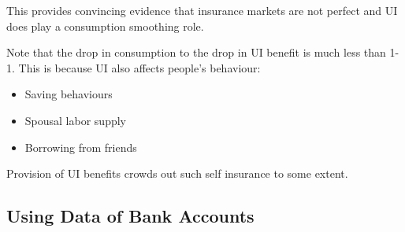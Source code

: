         This provides convincing evidence that insurance markets are not perfect and UI does play a consumption smoothing role.
        
        Note that the drop in consumption to the drop in UI benefit is much less than 1-1. This is because UI also affects people's  behaviour:
        \begin{itemize}
            \item Saving behaviours
            \item Spousal labor supply
            \item Borrowing from friends
        \end{itemize}
        Provision of UI benefits crowds out such self insurance to some extent.
    
    \subsection{Using Data of Bank Accounts}
    
